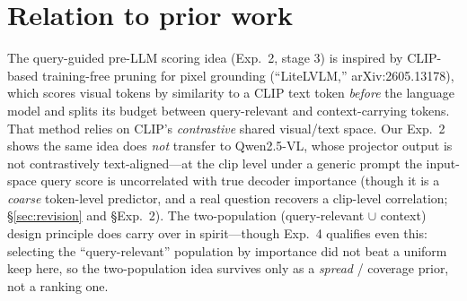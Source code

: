 \documentclass[11pt]{article}
\begin{document}
\section{Relation to prior work}\label{sec:related}
The query-guided pre-LLM scoring idea (Exp.~2, stage 3) is inspired by
CLIP-based training-free pruning for pixel grounding (``LiteLVLM,''
arXiv:2605.13178), which scores visual tokens by similarity to a CLIP text token
\emph{before} the language model and splits its budget between query-relevant and
context-carrying tokens. That method relies on CLIP's \emph{contrastive} shared
visual/text space. Our Exp.~2 shows the same idea does \emph{not} transfer to
Qwen2.5-VL, whose projector output is not contrastively text-aligned---at the clip level
under a generic prompt the input-space query score is uncorrelated with true decoder
importance (though it is a \emph{coarse} token-level predictor, and a real question recovers
a clip-level correlation; \S\ref{sec:revision} and \S Exp.~2). The two-population
(query-relevant $\cup$ context) design principle does carry over in spirit---though Exp.~4
qualifies even this: selecting the ``query-relevant'' population by importance did not
beat a uniform keep here, so the two-population idea survives only as a \emph{spread} /
coverage prior, not a ranking one.
\end{document}
